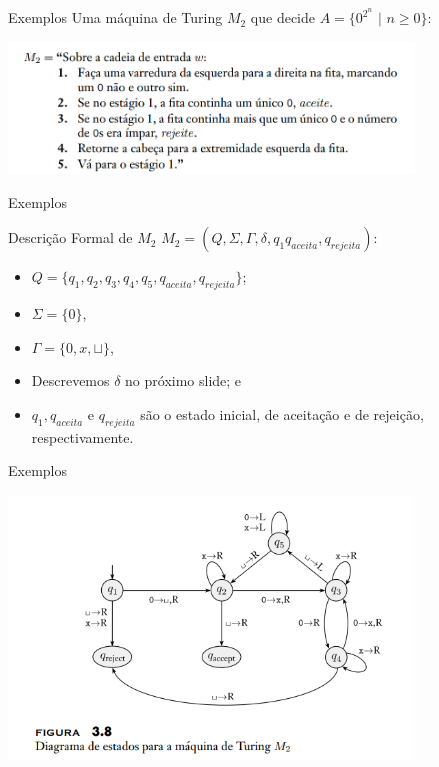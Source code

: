 \documentclass[xcolor=dvipsnames,table]{beamer}
\begin{document}
	\begin{frame}{Exemplos}
		Uma máquina de Turing $M_2$ que decide $A = \{ 0^{2^n} \mbox{ | } n \geq 0 \}$: 
	\begin{center}
			\includegraphics[height=3.5cm]{images/m2.png}
		\end{center}
	\end{frame}
	
	\begin{frame}{Exemplos}
		\begin{block}{Descrição Formal de $M_2$}
			$M_2 = (Q, \Sigma, \Gamma, \delta, q_1 q_{aceita}, q_{rejeita})$:
			\begin{itemize}
				\item $Q = \{ q_1, q_2, q_3, q_4, q_5, q_{aceita}, q_{rejeita} \}$;
				\item $\Sigma = \{ 0 \}$,
				\item $\Gamma = \{ 0, x, \sqcup \}$,
				\item Descrevemos $\delta$ no próximo slide; e
				\item $q_1, q_{aceita}$ e $q_{rejeita}$ são o estado inicial, de aceitação e de rejeição, respectivamente.
			\end{itemize}
		\end{block}
	\end{frame}
	
	\begin{frame}{Exemplos}
	\begin{center}
			\includegraphics[height=7cm]{images/fig38.png}
		\end{center}
	\end{frame}
    
\end{document}
